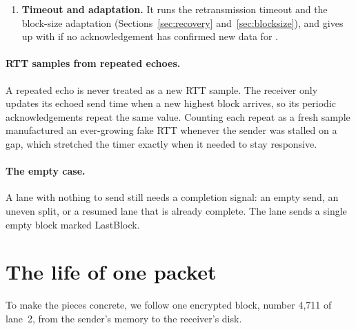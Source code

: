 \begin{enumerate}
\begin{itemize}
        new echoed send time fed to the RTT estimator;
      \item a \emph{Nack} marks a loss in the controller and resends each listed block;
      \item a \emph{StreamClose(aborted)} ends the lane with ;
      \item a \emph{PathChallenge} is answered, and a \emph{PathResponse} completes a pending path validation
        (Section~\ref{sec:path}).
    \end{itemize}
  \item \textbf{Timeout and adaptation.} It runs the retransmission timeout and the block-size adaptation
    (Sections~\ref{sec:recovery} and~\ref{sec:blocksize}), and gives up with  if no acknowledgement
    has confirmed new data for .
\end{enumerate}

\paragraph{RTT samples from repeated echoes.} A repeated echo is never treated as a new RTT sample. The receiver
only updates its echoed send time when a new highest block arrives, so its periodic acknowledgements repeat the
same value. Counting each repeat as a fresh sample manufactured an ever-growing fake RTT whenever the sender was
stalled on a gap, which stretched the timer exactly when it needed to stay responsive.

\paragraph{The empty case.} A lane with nothing to send still needs a completion signal: an empty send, an
uneven split, or a resumed lane that is already complete. The lane sends a single empty block marked LastBlock.

\section{The life of one packet}\label{sec:life}

To make the pieces concrete, we follow one encrypted block, number 4,711 of lane~2, from the sender's memory to
the receiver's disk.

